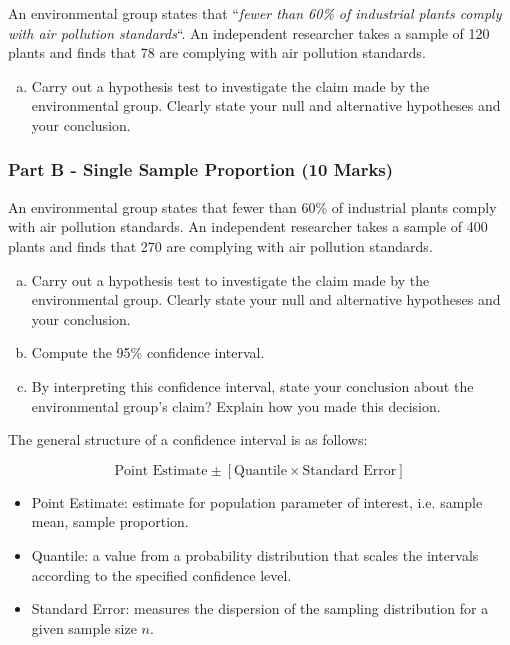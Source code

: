 \documentclass[a4paper,12pt]{article}
\begin{document}


 \item An environmental group states that ``\textit{fewer than 60\% of industrial plants comply with air pollution standards}``. An independent researcher takes a sample of 120 plants and finds that 78 are complying with air pollution standards. 
 \begin{enumerate}[(a)]
 \item  Carry out a hypothesis test to investigate the claim made by the environmental group. Clearly state your null and alternative hypotheses and your conclusion.
 \end{enumerate}
 
\large 
\subsubsection*{Part B  - Single Sample Proportion (10 Marks)}
\noindent An environmental group states that fewer than 60\% of industrial plants comply with air pollution standards. An independent researcher takes a sample of 400 plants and finds that 270 are complying with air pollution standards. 
\begin{enumerate}[(a)]
\item Carry out a hypothesis test to investigate the claim made by the environmental group. Clearly state your null and alternative hypotheses and your conclusion.
\item Compute the 95\% confidence interval.
\item By interpreting this confidence interval, state your conclusion about the environmental group's claim? Explain how you made this decision.
\end{enumerate}


\begin{framed}
The general structure of a confidence interval is as follows:

\[ \mbox{Point Estimate}  \pm \left[ \mbox{Quantile} \times \mbox{Standard Error} \right] \]


\begin{itemize}
\item Point Estimate: estimate for population parameter of interest, i.e. sample mean, sample proportion.
\item Quantile: a value from a probability distribution that scales the intervals according to the specified confidence level.
\item Standard Error: measures the dispersion of the sampling distribution for a given sample size $n$.
\end{itemize}
\end{framed}

\end{document}

